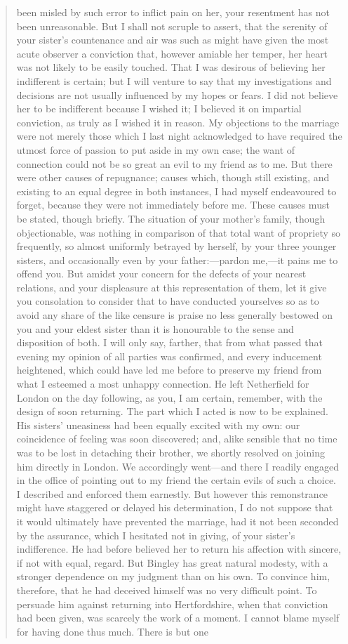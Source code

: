 \begin{quotation}
been misled by such error to inflict pain on her, your resentment has not been unreasonable. But I shall not scruple to assert, that the serenity of your sister's countenance and air was such as might have given the most acute observer a conviction that, however amiable her temper, her heart was not likely to be easily touched. That I was desirous of believing her indifferent is certain; but I will venture to say that my investigations and decisions are not usually influenced by my hopes or fears. I did not believe her to be indifferent because I wished it; I believed it on impartial conviction, as truly as I wished it in reason. My objections to the marriage were not merely those which I last night acknowledged to have required the utmost force of passion to put aside in my own case; the want of connection could not be so great an evil to my friend as to me. But there were other causes of repugnance; causes which, though still existing, and existing to an equal degree in both instances, I had myself endeavoured to forget, because they were not immediately before me. These causes must be stated, though briefly. The situation of your mother's family, though objectionable, was nothing in comparison of that total want of propriety so frequently, so almost uniformly betrayed by herself, by your three younger sisters, and occasionally even by your father:—pardon me,—it pains me to offend you. But amidst your concern for the defects of your nearest relations, and your displeasure at this representation of them, let it give you consolation to consider that to have conducted yourselves so as to avoid any share of the like censure is praise no less generally bestowed on you and your eldest sister than it is honourable to the sense and disposition of both. I will only say, farther, that from what passed that evening my opinion of all parties was confirmed, and every inducement heightened, which could have led me before to preserve my friend from what I esteemed a most unhappy connection. He left Netherfield for London on the day following, as you, I am certain, remember, with the design of soon returning. The part which I acted is now to be explained. His sisters' uneasiness had been equally excited with my own: our coincidence of feeling was soon discovered; and, alike sensible that no time was to be lost in detaching their brother, we shortly resolved on joining him directly in London. We accordingly went—and there I readily engaged in the office of pointing out to my friend the certain evils of such a choice. I described and enforced them earnestly. But however this remonstrance might have staggered or delayed his determination, I do not suppose that it would ultimately have prevented the marriage, had it not been seconded by the assurance, which I hesitated not in giving, of your sister's indifference. He had before believed her to return his affection with sincere, if not with equal, regard. But Bingley has great natural modesty, with a stronger dependence on my judgment than on his own. To convince him, therefore, that he had deceived himself was no very difficult point. To persuade him against returning into Hertfordshire, when that conviction had been given, was scarcely the work of a moment. I cannot blame myself for having done thus much. There is but one 
\end{quotation}
